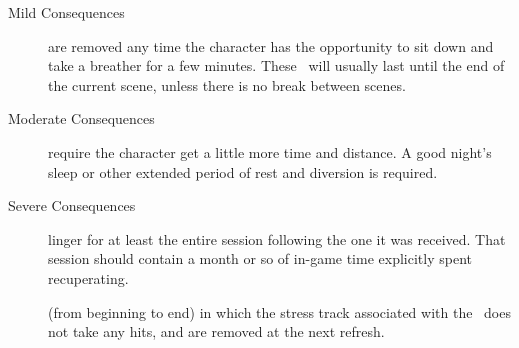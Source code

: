 \begin{description}
\item [Mild Consequences] are removed any time the character has the opportunity to sit down and take a breather for a few minutes. These \Consequences\ will usually last until the end of the current scene, unless there is no break between scenes.


\item [Moderate Consequences] require the character get a little more time and distance. A good night's sleep or other extended period of rest and diversion is required.


\item [Severe Consequences] linger for at least the entire session following the one it was received. That session should contain a month or so of in-game time explicitly spent recuperating.

 (from beginning to end) in which the stress track associated with the \Consequence\ does not take any hits, and are removed at the next refresh.
\end{description}
